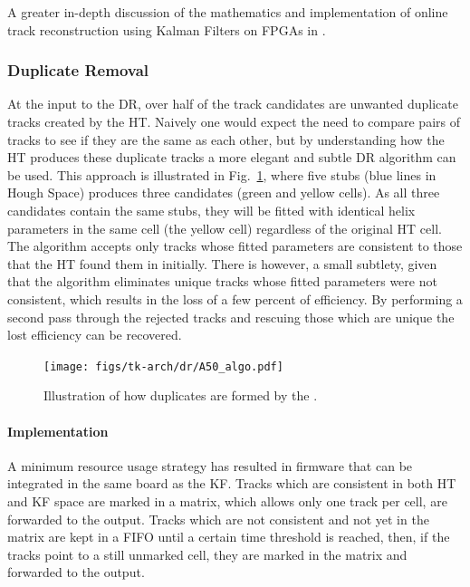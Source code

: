 A greater in-depth discussion of the mathematics and implementation of online track reconstruction using Kalman Filters on FPGAs in \cite{SSummers}.

\subsubsection{Duplicate Removal}
At the input to the DR, over half of the track candidates are unwanted duplicate tracks created by the HT.
Naively one would expect the need to compare pairs of tracks to see if they are the same as each other, but by understanding how the HT produces these duplicate tracks a more elegant and subtle DR algorithm can be used.
This approach is illustrated in Fig.~\ref{fig:DR}, where five stubs (blue lines in Hough Space) produces three candidates (green and yellow cells).
As all three candidates contain the same stubs, they will be fitted with identical helix parameters in the same cell (the yellow cell) regardless of the original HT cell.
The algorithm accepts only tracks whose fitted parameters are consistent to those that the HT found them in initially. There is however, a small subtlety, given that the algorithm eliminates unique tracks whose fitted parameters were not consistent, which results in the loss of a few percent of efficiency. 
By performing a second pass through the rejected tracks and rescuing those which are unique the lost efficiency can be recovered.

\begin{figure}[!h]
\centering
\texttt{[image: figs/tk-arch/dr/A50\_algo.pdf]}
\caption{Illustration of how duplicates are formed by the \rphi \HT.}
\label{fig:DR}
\end{figure}

\paragraph{Implementation}
A minimum resource usage strategy has resulted in firmware that can be integrated in the same board as the KF.
Tracks which are consistent in both HT and KF space are marked in a matrix, which allows only one track per cell, are forwarded to the output.
Tracks which are not consistent and not yet in the matrix are kept in a FIFO until a certain time threshold is reached, then, if the tracks point to a still unmarked cell, they are marked in the matrix and forwarded to the output. 

